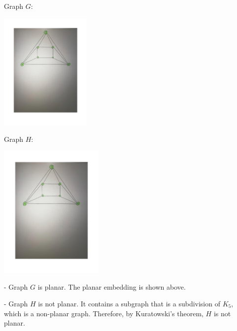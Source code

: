 \documentclass{article}
\begin{document}
\begin{problem}
\begin{center}
{\large Graph $G$:\ }
\begin{minipage}{2.1in}
		\includegraphics[width=1.75in]{planar_graphG_hw5_solution.pdf}
\end{minipage}
\hfill
{\large Graph $H$:\ }
\begin{minipage}{2.4in}
		\includegraphics[width=2in]{planar_graphH_hw5_solution.pdf}
\end{minipage}
\end{center}

\vspace{0.1in} - Graph $G$ is planar. The planar embedding is shown above.

\vspace{0.1in} - Graph $H$ is not planar. It contains a subgraph that is a subdivision of $K_{5}$, which is a non-planar graph. Therefore, by Kuratowski's theorem, $H$ is not planar.
\end{problem}

\vskip 0.25in

\end{document}

